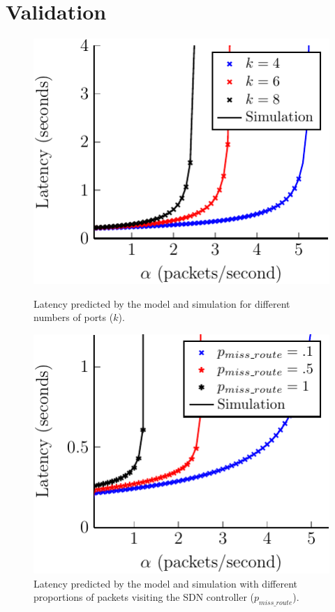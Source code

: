 
\section{Validation}
\label{sec:validation}
\begin{figure}

\centering
\begin{minipage}[b]{.48\textwidth}
	\includegraphics[width=\linewidth]{graphs/num_ports-crop}
	\caption{Latency predicted by the model and simulation for different numbers
of ports ($k$).} 
	\label{fig:num_ports}
\end{minipage}
\hfill
\begin{minipage}[b]{.48\textwidth}
	\includegraphics[width=\linewidth]{graphs/diff_sdn-crop}
	\caption{Latency predicted by the model and simulation with different
proportions of packets visiting the SDN controller ($p_{miss\_route}$).}
	\label{fig:sdn_perc}
\end{minipage}


\end{figure}
